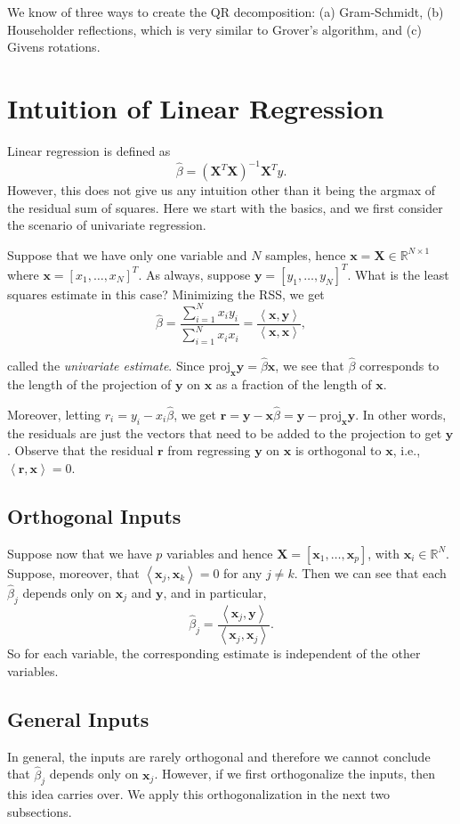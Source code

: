 \documentclass[11pt]{article}
\theoremstyle{definition}
\newcommand{\XX}{\mathbf{X}}
\newcommand{\xx}{\mathbf{x}}
\newcommand{\rr}{\mathbf{r}}
\newcommand{\yy}{\mathbf{y}}
\newcommand{\ip}[2]{\ensuremath{\left\langle#1, #2\right\rangle}}
\begin{document}
We know of three ways to create the QR decomposition: (a) Gram-Schmidt, (b)
Householder reflections, which is very similar to Grover's algorithm, and (c)
Givens rotations.

\section{Intuition of Linear Regression}
Linear regression is defined as
\[\hat\beta=(\XX^T\XX)^{-1}\XX^T y.\] However, this does not give us any
intuition other than it being the argmax of the residual sum of squares. Here we
start with the basics, and we first consider the scenario of univariate
regression.

Suppose that we have only one variable and $N$ samples, hence
$\xx=\XX\in\mathbb{R}^{N\times 1}$ where $\xx=[x_1,\ldots,x_N]^T$. As always,
suppose $\yy=[y_1,\ldots,y_N]^T$. What is the least squares estimate in this
case? Minimizing the RSS, we get
\[\hat\beta=\frac{\sum_{i=1}^N x_iy_i}{\sum_{i=1}^N
		x_ix_i}=\frac{\ip\xx\yy}{\ip\xx\xx},\]

called the \emph{univariate estimate}. Since
$\mathrm{proj}_\xx\yy=\hat\beta\xx$, we see that $\hat\beta$ corresponds to the
length of the projection of $\yy$ on $\xx$ as a fraction of the length of $\xx$.

Moreover, letting $r_i=y_i-x_i\hat\beta$, we get
$\rr=\yy-\xx\hat\beta=\yy-\mathrm{proj}_\xx\yy$. In other words, the residuals
are just the vectors that need to be added to the projection to get $\yy$.
Observe that the residual $\rr$ from regressing $\yy$ on $\xx$ is orthogonal to
$\xx$, i.e., $\ip\rr\xx=0$.

\subsection{Orthogonal Inputs}
Suppose now that we have $p$ variables and hence $\XX=[\xx_1,\ldots,\xx_p]$,
with $\xx_i\in\mathbb{R}^N$. Suppose, moreover, that $\ip{\xx_j}{\xx_k}=0$ for
any $j\ne k$. Then we can see that each $\hat\beta_j$ depends only on $\xx_j$
and $\yy$, and in particular,
\[\hat\beta_j=\frac{\ip{\xx_j}\yy}{\ip{\xx_j}{\xx_j}}.\] So for each variable,
the corresponding estimate is independent of the other variables.

\subsection{General Inputs}
In general, the inputs are rarely orthogonal and therefore we cannot conclude
that $\hat\beta_j$ depends only on $\xx_j$. However, if we first orthogonalize
the inputs, then this idea carries over. We apply this orthogonalization in the
next two subsections.
\end{document}
